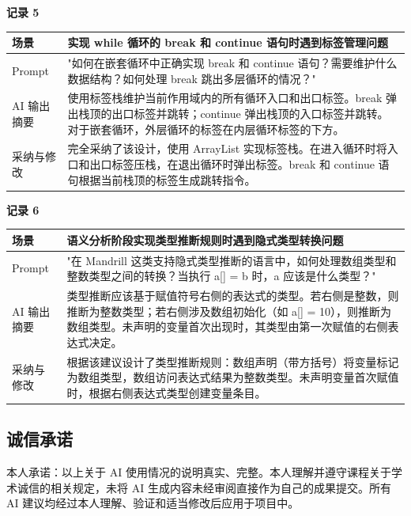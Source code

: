 \documentclass[12pt,hyperref,a4paper,UTF8]{ctexart}
\begin{document}
\vspace{1em}

\textbf{记录 5}

\begin{tabular}{|p{3cm}|p{10cm}|}
\hline
场景 & 实现 while 循环的 break 和 continue 语句时遇到标签管理问题 \\ \hline
Prompt & "如何在嵌套循环中正确实现 break 和 continue 语句？需要维护什么数据结构？如何处理 break 跳出多层循环的情况？" \\ \hline
AI 输出摘要 & 使用标签栈维护当前作用域内的所有循环入口和出口标签。break 弹出栈顶的出口标签并跳转；continue 弹出栈顶的入口标签并跳转。对于嵌套循环，外层循环的标签在内层循环标签的下方。 \\ \hline
采纳与修改 & 完全采纳了该设计，使用 ArrayList 实现标签栈。在进入循环时将入口和出口标签压栈，在退出循环时弹出标签。break 和 continue 语句根据当前栈顶的标签生成跳转指令。 \\ \hline
\end{tabular}

\vspace{1em}

\textbf{记录 6}

\begin{tabular}{|p{3cm}|p{10cm}|}
\hline
场景 & 语义分析阶段实现类型推断规则时遇到隐式类型转换问题 \\ \hline
Prompt & "在 Mandrill 这类支持隐式类型推断的语言中，如何处理数组类型和整数类型之间的转换？当执行 a[] = b 时，a 应该是什么类型？" \\ \hline
AI 输出摘要 & 类型推断应该基于赋值符号右侧的表达式的类型。若右侧是整数，则推断为整数类型；若右侧涉及数组初始化（如 a[] = 10），则推断为数组类型。未声明的变量首次出现时，其类型由第一次赋值的右侧表达式决定。 \\ \hline
采纳与修改 & 根据该建议设计了类型推断规则：数组声明（带方括号）将变量标记为数组类型，数组访问表达式结果为整数类型。未声明变量首次赋值时，根据右侧表达式类型创建变量条目。 \\ \hline
\end{tabular}

\subsection{诚信承诺}

本人承诺：以上关于 AI 使用情况的说明真实、完整。本人理解并遵守课程关于学术诚信的相关规定，未将 AI 生成内容未经审阅直接作为自己的成果提交。所有 AI 建议均经过本人理解、验证和适当修改后应用于项目中。
\end{document}
